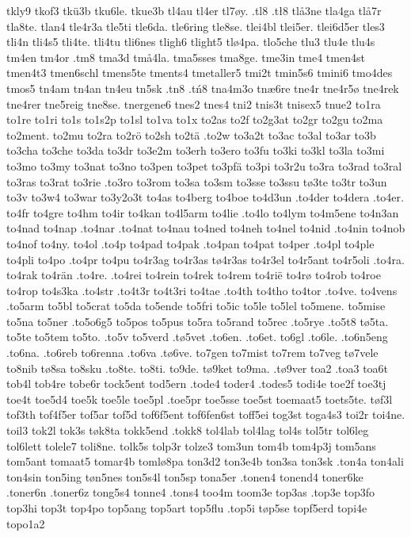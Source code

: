 {{tkly9
tkof3
tkü3b
tku6le.
tkue3b
tl4au
tl4er
tl7øy.
.tl8
.tł8
tlå3ne
tla4ga
tlå7r
tla8te.
tlan4
tle4r3a
tle5ti
tle6da.
tle6ring
tle8se.
tlei4bl
tlei5er.
tlei6d5er
tles3
tli4n
tli4s5
tli4te.
tli4tu
tli6nes
tligh6
tlight5
tlø4pa.
tlo5che
tlu3
tlu4e
tlu4s
tm4en
tm4or
.tm8
tma3d
tmå4la.
tma5sses
tma8ge.
tme3in
tme4
tmen4st
tmen4t3
tmen6schl
tmens5te
tments4
tmetaller5
tmi2t
tmin5s6
tmini6
tmo4des
tmos5
tn4am
tn4an
tn4eu
tn5sk
.tn8
.tń8
tna4m3o
tnæ6re
tne4r
tne4r5ø
tne4rek
tne4rer
tne5reig
tne8se.
tnergene6
tnes2
tnes4
tni2
tnis3t
tnisex5
tnue2
to1ra
to1re
to1ri
to1s
to1s2p
to1sl
to1va
to1x
to2as
to2f
to2g3at
to2gr
to2gu
to2ma
to2ment.
to2mu
to2ra
to2rö
to2sh
to2tä
.to2w
to3a2t
to3ac
to3al
to3ar
to3b
to3cha
to3che
to3da
to3dr
to3e2m
to3erh
to3ero
to3fu
to3ki
to3kl
to3la
to3mi
to3mo
to3my
to3nat
to3no
to3pen
to3pet
to3pfä
to3pi
to3r2u
to3ra
to3rad
to3ral
to3ras
to3rat
to3rie
.to3ro
to3rom
to3sa
to3sm
to3sse
to3ssu
tø3te
to3tr
to3un
to3v
to3w4
to3war
to3y2o3t
to4as
to4berg
to4boe
to4d3un
.to4der
to4dera
.to4er.
to4fr
to4gre
to4hm
to4ir
to4kan
to4l5arm
to4lie
.to4lo
to4lym
to4m5ene
to4n3an
to4nad
to4nap
.to4nar
.to4nat
to4nau
to4ned
to4neh
to4nel
to4nid
.to4nin
to4nob
to4nof
to4ny.
to4ol
.to4p
to4pad
to4pak
.to4pan
to4pat
to4per
.to4pl
to4ple
to4pli
to4po
.to4pr
to4pu
to4r3ag
to4r3as
tø4r3as
to4r3el
to4r5ant
to4r5oli
.to4ra.
to4rak
to4rän
.to4re.
.to4rei
to4rein
to4rek
to4rem
to4rië
to4rø
to4rob
to4roe
to4rop
to4s3ka
.to4str
.to4t3r
to4t3ri
to4tae
.to4th
to4tho
to4tor
.to4ve.
to4vens
.to5arm
to5bl
to5crat
to5da
to5ende
to5fri
to5ic
to5le
to5lel
to5mene.
to5mise
to5na
to5ner
.to5o6g5
to5pos
to5pus
to5ra
to5rand
to5rec
.to5rye
.to5t8
tø5ta.
to5te
to5tem
to5to.
.to5v
to5verd
.tø5vet
.to6en.
.to6et.
to6gl
.to6le.
.to6n5eng
.to6na.
.to6reb
to6renna
.to6va
.tø6ve.
to7gen
to7mist
to7rem
to7veg
tø7vele
to8nib
tø8sa
to8sku
.to8te.
to8ti.
to9de.
tø9ket
to9ma.
.tø9ver
toa2
.toa3
toa6t
tob4l
tob4re
tobe6r
tock5ent
tod5ern
.tode4
toder4
.todes5
todi4e
toe2f
toe3tj
toe4t
toe5d4
toe5k
toe5le
toe5pl
.toe5pr
toe5sse
toe5st
toemaat5
toets5te.
tøf3l
tof3th
tof4f5er
tof5ar
tof5d
tof6f5ent
tof6fen6st
toff5ei
tog3st
toga4s3
toi2r
toi4ne.
toil3
tok2l
tok3s
tøk8ta
tokk5end
.tokk8
tol4lab
tol4lag
tol4s
tol5tr
tol6leg
tol6lett
tolele7
toli8ne.
tolk5s
tolp3r
tolze3
tom3un
tom4b
tom4p3j
tom5ans
tom5ant
tomaat5
tomar4b
tomlø8pa
ton3d2
ton3e4b
ton3sa
ton3sk
.ton4a
ton4ali
ton4sin
ton5ing
tøn5nes
ton5s4l
ton5sp
tona5er
.tonen4
tonend4
toner6ke
.toner6n
.toner6z
tong5s4
tonne4
.tons4
too4m
toom3e
top3as
.top3e
top3fo
top3hi
top3t
top4po
top5ang
top5art
top5flu
.top5i
tøp5se
topf5erd
topi4e
topo1a2
}}
